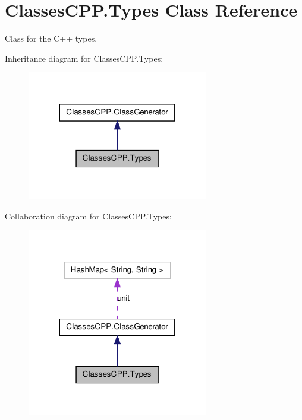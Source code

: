 \hypertarget{class_classes_c_p_p_1_1_types}{
\section{ClassesCPP.Types Class Reference}
\label{class_classes_c_p_p_1_1_types}
}


Class for the C++ types.  




Inheritance diagram for ClassesCPP.Types:\nopagebreak
\begin{figure}[H]
\begin{center}
\leavevmode
\includegraphics[width=224pt]{class_classes_c_p_p_1_1_types__inherit__graph}
\end{center}
\end{figure}


Collaboration diagram for ClassesCPP.Types:\nopagebreak
\begin{figure}[H]
\begin{center}
\leavevmode
\includegraphics[width=224pt]{class_classes_c_p_p_1_1_types__coll__graph}
\end{center}
\end{figure}
